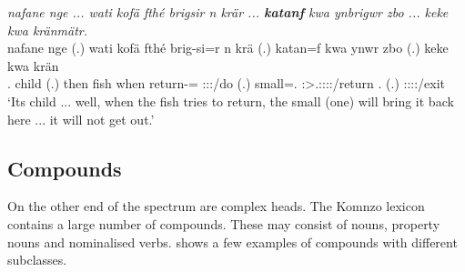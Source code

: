 \begin{exe}
 	\ex \emph{nafane nge ... wati kofä fthé brigsir n krär ... \textbf{katanf} kwa ynbrigwr zbo ... keke kwa kränmätr.}\\
 	\gll nafane nge (.) wati kofä fthé brig-si=r n krä (.) katan=f kwa ynwr zbo (.) keke kwa krän\\
 	\Tsg.\Poss{} child (.) then fish when return-\Nmlz=\Purp{} \Imn{} \Stsg:\Sbj:\Irr:\Pfv/do (.) small=\Erg.\Sg{} \Fut{} \Stsg:\Sbj>\Tsg.\Masc:\Obj:\Nonpast:\Ipfv:\Venit/return \Prox.\All{} (.) \Neg{} \Fut{} \Stsg:\Sbj:\Irr:\Pfv:\Venit/exit\\
 	\trans `Its child ... well, when the fish tries to return, the small (one) will bring it back here ... it will not get out.'
 	\label{ex537}
\end{exe}

\subsection{Compounds}\label{headcompounds}

On the other end of the spectrum are complex heads. The Komnzo lexicon contains a large number of  compounds. These may consist of nouns, property nouns and nominalised verbs.  shows a few examples of compounds with different  subclasses.

